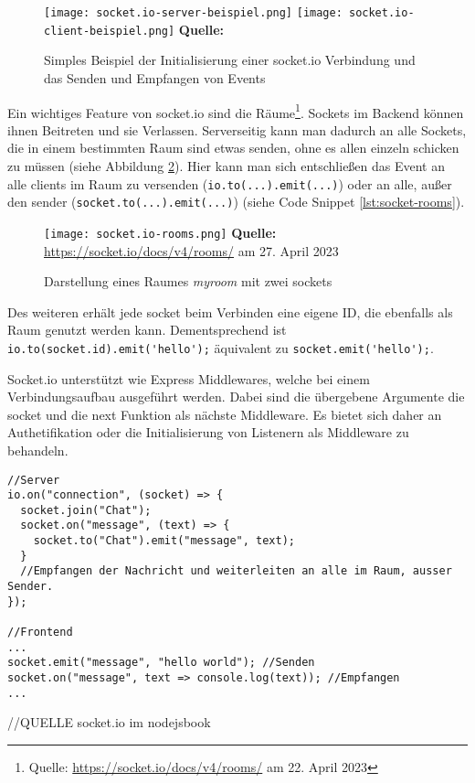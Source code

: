   \begin{figure}[ht]
\raggedleft
  \texttt{[image: socket.io-server-beispiel.png]}
  \texttt{[image: socket.io-client-beispiel.png]}
    \footnotesize\sffamily\textbf{Quelle:} \cite{socketio}
  \caption{Simples Beispiel der Initialisierung einer socket.io Verbindung und das Senden und Empfangen von Events}
  \label{fig:socket.io-beispiel}
\end{figure}

Ein wichtiges Feature von socket.io sind die Räume\footnote{Quelle: \url{https://socket.io/docs/v4/rooms/} am 22. April 2023}. Sockets im Backend können ihnen Beitreten und sie Verlassen. Serverseitig kann man dadurch an alle Sockets, die in einem bestimmten Raum sind etwas senden, ohne es allen einzeln schicken zu müssen (siehe Abbildung \ref{fig:socket.io-room}). Hier kann man sich entschließen das Event an alle clients im Raum zu versenden (\verb|io.to(...).emit(...)|) oder an alle, außer den sender (\verb|socket.to(...).emit(...)|) (siehe Code Snippet \ref{lst:socket-rooms}).


  \begin{figure}[ht]
  \centering
  \texttt{[image: socket.io-rooms.png]}
\raggedleft
    \footnotesize\sffamily\textbf{Quelle:} \url{https://socket.io/docs/v4/rooms/} am 27. April 2023
  \caption{Darstellung eines Raumes \textit{myroom} mit zwei sockets}
  \label{fig:socket.io-room}
\end{figure}

Des weiteren erhält jede socket beim Verbinden eine eigene ID, die ebenfalls als Raum genutzt werden kann. Dementsprechend ist \verb|io.to(socket.id).emit('hello');| äquivalent zu \verb|socket.emit('hello');|.

Socket.io unterstützt wie Express Middlewares, welche bei einem Verbindungsaufbau ausgeführt werden. Dabei sind die übergebene Argumente die socket und die next Funktion als nächste Middleware.
Es bietet sich daher an Authetifikation oder die Initialisierung von Listenern als Middleware  zu behandeln.


\begin{lstlisting}[style=codeStyle, caption={Beispiel zum Beitreten Raums und das senden eines Events in diesen Raum}, label={lst:socket-rooms}]
//Server
io.on("connection", (socket) => {
  socket.join("Chat");
  socket.on("message", (text) => {
  	socket.to("Chat").emit("message", text);
  }
  //Empfangen der Nachricht und weiterleiten an alle im Raum, ausser Sender.
});

//Frontend
...
socket.emit("message", "hello world"); //Senden
socket.on("message", text => console.log(text)); //Empfangen
...
\end{lstlisting}
//QUELLE socket.io im nodejsbook
